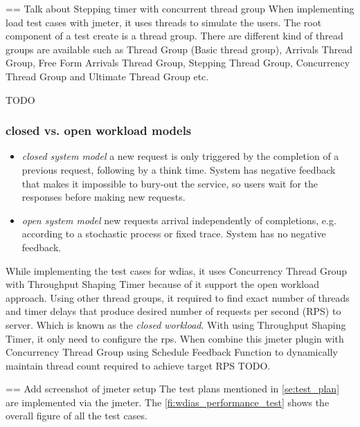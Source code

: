 == Talk about Stepping timer with concurrent thread group
When implementing load test cases with \acrshort{jmeter}, it uses threads to simulate the users. The root component of a test create is a thread group. There are different kind of thread groups are available such as Thread Group (Basic thread group), Arrivals Thread Group, Free Form Arrivals Thread Group, Stepping Thread Group, Concurrency Thread Group and Ultimate Thread Group etc.

TODO
\subsubsection{closed vs. open workload models} \cite{Haggett1998AnWales}
\label{subse:closed_vs_open_workload}
\begin{itemize}
    \item \emph{closed system model} a new request is only triggered by the completion of a previous request, following by a think time. System has negative feedback that makes it impossible to bury-out the service, so users wait for the responses before making new requests.
    \item \emph{open system model} new requests arrival independently of completions, e.g. according to a stochastic process or fixed trace. System has no negative feedback.
\end{itemize}
While implementing the test cases for \acrshort{wdias}, it uses Concurrency Thread Group with Throughput Shaping Timer because of it support the open workload approach.
Using other thread groups, it required to find exact number of threads and timer delays that produce desired number of requests per second (RPS) to server. Which is known as the \emph{closed workload}.
With using Throughput Shaping Timer, it only need to configure the \acrfull{rps}. When combine this \acrshort{jmeter} plugin with Concurrency Thread Group using Schedule Feedback Function to dynamically maintain thread count required to achieve target RPS \cite{Haggett1998AnWales} TODO.

== Add screenshot of jmeter setup
The test plans mentioned in \ref{se:test_plan} are implemented via the \acrshort{jmeter}. The \ref{fi:wdias_performance_test} shows the overall figure of all the test cases.


